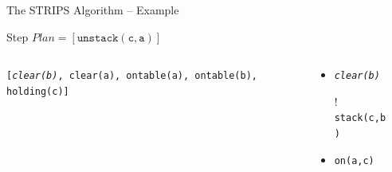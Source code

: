 \documentclass[presentation]{beamer}\mode<presentation>{\usetheme{AMSBolognaFC}}
\begin{document}
\begin{frame}[c]{The STRIPS Algorithm -- Example}
\small

    \begin{exampleblock}{Step \nextStripsExampleStep{} \hfill $Plan = [\mathtt{unstack(c,a)}]$}
        \begin{columns}[t]
            \begin{column}{.30\linewidth}\centering
                \alert{\texttt{[\emph{clear(b)}, clear(a), ontable(a), ontable(b), holding(c)]}}
            \end{column}
            \begin{column}{.50\linewidth}\centering
                \begin{itemize}
                    \item \alert{\emph{\texttt{clear(b)}}}
                    \item[!] \texttt{stack(c,b)}
                    \item \texttt{on(a,c)}
                \end{itemize}
            \end{column}
            \begin{column}{.10\linewidth}\centering
                
            \end{column}
        \end{columns}
    \end{exampleblock}

\end{frame}
\end{document}
